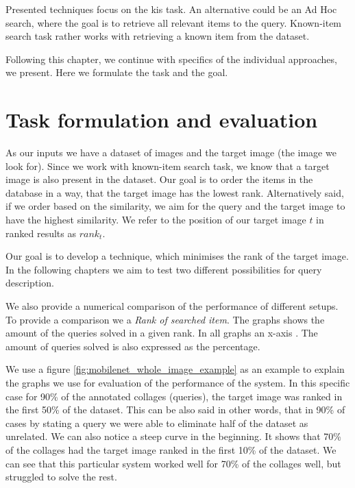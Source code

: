 Presented techniques focus on the \acrlong{kis} task. An alternative could be an Ad Hoc search, where the goal is to retrieve all relevant items to the query. Known-item search task rather works with retrieving a known item from the dataset.

Following this chapter, we continue with specifics of the individual approaches, we present. Here we formulate the task and the goal.

\section*{Task formulation and evaluation}

As our inputs we have a dataset of images and the target image (the image we look for). Since we work with known-item search task, we know that a target image is also present in the dataset. Our goal is to order the items in the database in a way, that the target image has the lowest rank. Alternatively said, if we order based on the similarity, we aim for the query and the target image to have the highest similarity. We refer to the position of our target image $t$ in ranked results as $rank_t$.

Our goal is to develop a technique, which minimises the rank of the target image. In the following chapters we aim to test two different possibilities for query description.

We also provide a numerical comparison of the performance of different setups. To provide a comparison we a \emph{Rank of searched item}. The graphs shows the amount of the queries solved in a given rank. In all graphs an x-axis  . The amount of queries solved is also expressed as the percentage.



We use a figure \ref{fig:mobilenet_whole_image_example} as an example to explain the graphs we use for evaluation of the performance of the system. In this specific case for 90\% of the annotated collages (queries), the target image was ranked in the first 50\% of the dataset. This can be also said in other words, that in 90\% of cases by stating a query we were able to eliminate half of the dataset as unrelated. We can also notice a steep curve in the beginning. It shows that 70\% of the collages had the target image ranked in the first 10\% of the dataset. We can see that this particular system worked well for 70\% of the collages well, but struggled to solve the rest.

